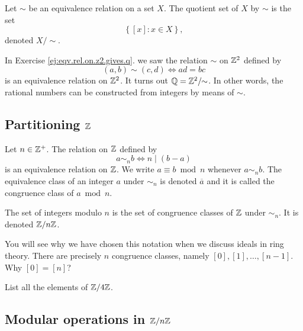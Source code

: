 \documentclass[11pt,a4paper]{article}
\begin{document}
\begin{defi}
    Let \(\sim\) be an equivalence relation on a set \(X\).
    The quotient set of \(X\) by \(\sim\) is the set 
    \[\left\{ [x] : x \in X \right\},\]
    denoted \(X/ \!\!\sim\).

\end{defi}


\begin{exa}
    In Exercise \ref{ej:eqv.rel.on.z2.gives.q}.
    we saw the relation \(\sim\) on \(\mathbb{Z}^2\) defined by 
    \[(a,b) \sim (c,d) \iff ad = bc\]
    is an equivalence relation on \( \mathbb{Z}^2\).
    It turns out 
    \(\mathbb{Q} = \mathbb{Z}^2 / \!\! \sim\).
    In other words, the rational numbers can be constructed from integers by means of \(\sim\).
\end{exa}

\subsection[]{Partitioning \(\mathbb{Z}\)}

Let \(n\in \mathbb{Z}^+\).
The relation  on \(\mathbb{Z}\) defined by 
\[a\sim_n b\iff n\mid (b-a)\]
is an equivalence relation on \(\mathbb{Z}\).
We write \(a \equiv b \bmod n\)
whenever \(a \sim_n b\).
The equivalence class of an integer \(a\) under \(\sim_n\) is denoted \(\overline{a}\) and it is called the congruence class of \(a\bmod n\).

\begin{defi}
    The set of integers modulo \(n\) is the set of congruence classes of \(\mathbb{Z}\) under \(\sim_n\).
    It is denoted \(\mathbb{Z}/ n \mathbb{Z}\).
\end{defi}

You will see why we have chosen this notation when we discuss ideals in ring theory.
There are precisely \(n\) congruence classes,
namely 
\([0],[1],\ldots,[n-1].\)
Why \([0] = [n]\)?


\begin{eje}
    List all the elements of \(\mathbb{Z}/ 4 \mathbb{Z}\).
\end{eje}


\subsection[]{Modular operations in \(\mathbb{Z}/ n \mathbb{Z}\)}
\end{document}
